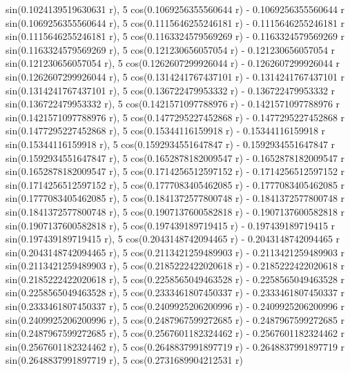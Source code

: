 \documentclass[a4paper,10pt]{article}
\begin{document}
\begin{eulernotebook}
\begin{eulercomment}
\begin{eulercomment}
\begin{eulercomment}
\begin{eulercomment}
\begin{eulercomment}
\begin{eulercomment}
\begin{eulercomment}
\begin{eulercomment}
\begin{eulercomment}
\begin{eulercomment}
\begin{eulercomment}
\begin{eulercomment}
\begin{eulercomment}
\begin{eulercomment}
\begin{eulercomment}
\begin{eulercomment}
\begin{eulercomment}
\begin{eulercomment}
\begin{eulercomment}
\begin{eulercomment}
\begin{eulercomment}
\begin{eulercomment}
\begin{eulercomment}
\begin{eulercomment}
\begin{eulercomment}
\begin{eulercomment}
\begin{eulercomment}
\begin{eulercomment}
\begin{euleroutput}
   sin(0.1024139519630631 r), 5 cos(0.1069256355560644 r)
   - 0.1069256355560644 r sin(0.1069256355560644 r), 
  5 cos(0.1115646255246181 r) - 0.1115646255246181 r
   sin(0.1115646255246181 r), 5 cos(0.1163324579569269 r)
   - 0.1163324579569269 r sin(0.1163324579569269 r), 
  5 cos(0.121230656057054 r) - 0.121230656057054 r
   sin(0.121230656057054 r), 5 cos(0.1262607299926044 r)
   - 0.1262607299926044 r sin(0.1262607299926044 r), 
  5 cos(0.1314241767437101 r) - 0.1314241767437101 r
   sin(0.1314241767437101 r), 5 cos(0.136722479953332 r)
   - 0.136722479953332 r sin(0.136722479953332 r), 
  5 cos(0.1421571097788976 r) - 0.1421571097788976 r
   sin(0.1421571097788976 r), 5 cos(0.1477295227452868 r)
   - 0.1477295227452868 r sin(0.1477295227452868 r), 
  5 cos(0.15344116159918 r) - 0.15344116159918 r
   sin(0.15344116159918 r), 5 cos(0.1592934551647847 r)
   - 0.1592934551647847 r sin(0.1592934551647847 r), 
  5 cos(0.1652878182009547 r) - 0.1652878182009547 r
   sin(0.1652878182009547 r), 5 cos(0.1714256512597152 r)
   - 0.1714256512597152 r sin(0.1714256512597152 r), 
  5 cos(0.1777083405462085 r) - 0.1777083405462085 r
   sin(0.1777083405462085 r), 5 cos(0.1841372577800748 r)
   - 0.1841372577800748 r sin(0.1841372577800748 r), 
  5 cos(0.1907137600582818 r) - 0.1907137600582818 r
   sin(0.1907137600582818 r), 5 cos(0.197439189719415 r)
   - 0.197439189719415 r sin(0.197439189719415 r), 
  5 cos(0.2043148742094465 r) - 0.2043148742094465 r
   sin(0.2043148742094465 r), 5 cos(0.2113421259489903 r)
   - 0.2113421259489903 r sin(0.2113421259489903 r), 
  5 cos(0.2185222422020618 r) - 0.2185222422020618 r
   sin(0.2185222422020618 r), 5 cos(0.2258565049463528 r)
   - 0.2258565049463528 r sin(0.2258565049463528 r), 
  5 cos(0.2333461807450337 r) - 0.2333461807450337 r
   sin(0.2333461807450337 r), 5 cos(0.2409925206200996 r)
   - 0.2409925206200996 r sin(0.2409925206200996 r), 
  5 cos(0.2487967599272685 r) - 0.2487967599272685 r
   sin(0.2487967599272685 r), 5 cos(0.2567601182324462 r)
   - 0.2567601182324462 r sin(0.2567601182324462 r), 
  5 cos(0.2648837991897719 r) - 0.2648837991897719 r
   sin(0.2648837991897719 r), 5 cos(0.2731689904212531 r)

\end{euleroutput}
\end{eulercomment}
\end{eulercomment}
\end{eulercomment}
\end{eulercomment}
\end{eulercomment}
\end{eulercomment}
\end{eulercomment}
\end{eulercomment}
\end{eulercomment}
\end{eulercomment}
\end{eulercomment}
\end{eulercomment}
\end{eulercomment}
\end{eulercomment}
\end{eulercomment}
\end{eulercomment}
\end{eulercomment}
\end{eulercomment}
\end{eulercomment}
\end{eulercomment}
\end{eulercomment}
\end{eulercomment}
\end{eulercomment}
\end{eulercomment}
\end{eulercomment}
\end{eulercomment}
\end{eulercomment}
\end{eulercomment}
\end{eulernotebook}
\end{document}
